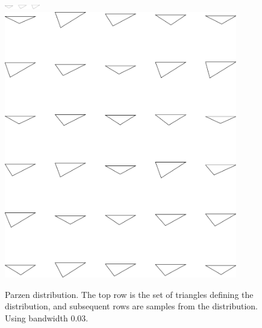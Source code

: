 \begin{figure}
\includegraphics[width=0.6in]{output/1.models/test_parzen/parzen_true.png}\\ 
\includegraphics[width=4in]{output/1.models/test_parzen/parzen_0.03_samples.png}\\ 
\caption{Parzen distribution. The top row is the set of triangles
  defining the distribution, and subsequent rows are samples from the
  distribution. Using bandwidth $0.03$. }
\label{fig-parzen-2}
\end{figure}


